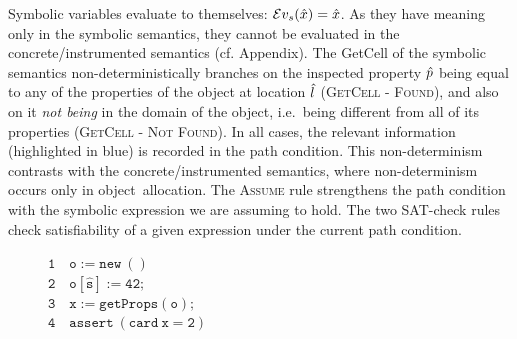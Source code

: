 \noindent Symbolic variables evaluate to themselves: $\mathcal{E}v_{s}(\hat{x}) = \hat{x}$. 
As they have meaning only in the symbolic semantics, they cannot be evaluated in the concrete/instrumented semantics (cf. Appendix). 
The GetCell of the symbolic semantics non-deterministically branches on the inspected property $\hat{p}$ being equal to any of the properties of the object at location $\hat{l}$ (\textsc{GetCell - Found}), and also on it \emph{not being} in the domain of the object, i.e.~being different from all of its properties (\textsc{GetCell - Not Found}). In all cases, the relevant information (highlighted in blue) is recorded in the path condition. This non-determinism contrasts with the concrete/instrumented semantics, where non-determinism occurs only in object~allocation. 
The \textsc{Assume} rule strengthens the path condition with the symbolic expression we are assuming to hold. The two SAT-check rules check satisfiability of a given expression under the current path condition. 

 

\begin{figure}
\vspace*{0.1cm}
{\footnotesize
\hspace*{-0.55cm} $\mathtt{1\quad o := new\ ()}$ \\[-0.06cm]
\hspace*{-0.55cm} $\mathtt{2\quad o[\hat{s}] := 42};$ \\[-0.06cm]
\hspace*{-0.55cm} $\mathtt{3\quad x := getProps(o);}$ \\[-0.06cm]
\hspace*{-0.55cm} $\mathtt{4\quad assert\ (card \ x = 2)}$
}
\vspace*{-0.35cm}
\end{figure}


